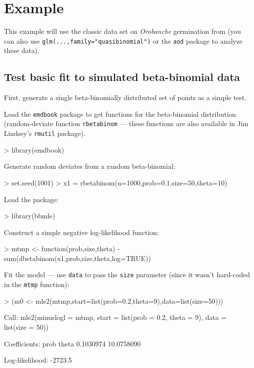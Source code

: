 \documentclass{article}
\newcommand{\code}[1]{{\tt #1}}
\begin{document}
\section{Example}

This example will use the classic data set on
\emph{Orobanche} germination from \cite{Crowder1978}
(you can also use
\code{glm(...,family="quasibinomial")} or
the \code{aod} package to analyze these data).

\subsection{Test basic fit to simulated beta-binomial data}

First, generate a single beta-binomially distributed
set of points as a simple test.

Load the \code{emdbook} package
to get functions for the beta-binomial distribution (random-deviate 
function \code{rbetabinom} --- these functions are also available
in Jim Lindsey's \code{rmutil} package).
\begin{Schunk}
\begin{Sinput}
> library(emdbook)
\end{Sinput}
\end{Schunk}

Generate random deviates from a random beta-binomial:
\begin{Schunk}
\begin{Sinput}
> set.seed(1001)
> x1 = rbetabinom(n=1000,prob=0.1,size=50,theta=10)
\end{Sinput}
\end{Schunk}

Load the package:
\begin{Schunk}
\begin{Sinput}
> library(bbmle)
\end{Sinput}
\end{Schunk}

Construct a simple negative log-likelihood function:
\begin{Schunk}
\begin{Sinput}
> mtmp <- function(prob,size,theta) {
   -sum(dbetabinom(x1,prob,size,theta,log=TRUE))
 }
\end{Sinput}
\end{Schunk}

Fit the model --- use \code{data} to pass the \code{size}
parameter (since it wasn't hard-coded in the \code{mtmp}
function):
\begin{Schunk}
\begin{Sinput}
> (m0 <- mle2(mtmp,start=list(prob=0.2,theta=9),data=list(size=50)))
\end{Sinput}
\begin{Soutput}
Call:
mle2(minuslogl = mtmp, start = list(prob = 0.2, theta = 9), data = list(size = 50))

Coefficients:
      prob      theta 
 0.1030974 10.0758090 

Log-likelihood: -2723.5 
\end{Soutput}
\end{Schunk}
\end{document}
